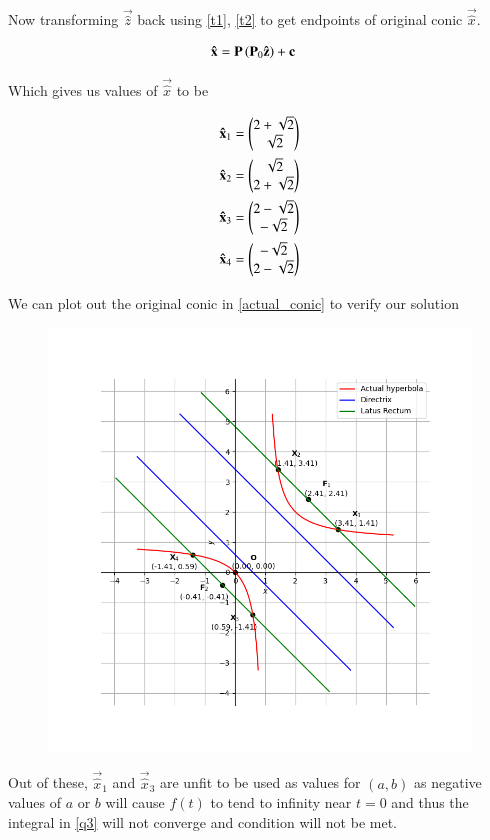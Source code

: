 \documentclass[journal]{IEEEtran}
\begin{document}
Now transforming $\vec{\hat{z}}$ back using \eqref{t1}, \eqref{t2} to get endpoints of original conic $\vec{\hat{x}}$.

\begin{align}
	\mathbf{\hat{x}} &= \mathbf{P}\left(\mathbf{P}_0 \mathbf{\hat{z}}\right) + \mathbf{c}
\end{align}

Which gives us values of $\vec{\hat{x}}$ to be

\begin{align*}
	\mathbf{\hat{x}}_1 &= \begin{pmatrix}2+\sqrt{2} \\ \sqrt{2}\end{pmatrix}\\
	\mathbf{\hat{x}}_2 &= \begin{pmatrix}\sqrt{2} \\ 2+\sqrt{2}\end{pmatrix}\\
	\mathbf{\hat{x}}_3 &= \begin{pmatrix}2-\sqrt{2} \\ -\sqrt{2}\end{pmatrix}\\
	\mathbf{\hat{x}}_4 &= \begin{pmatrix}-\sqrt{2} \\ 2-\sqrt{2}\end{pmatrix}
\end{align*}

We can plot out the original conic in \eqref{actual_conic} to verify our solution

\begin{figure}[H]
	\centering
	\includegraphics[width=0.75\columnwidth]{Figures/Hyperbola.png} 
	\caption{}
	\label{fig:Hyperbola}
\end{figure}

Out of these, $\vec{\hat{x}}_1$ and $\vec{\hat{x}}_3$ are unfit to be used as values for $(a, b)$ as negative values of $a$ or $b$ will cause $f(t)$ to tend to infinity near $t = 0$ and thus the integral in \eqref{q3} will not converge and condition will not be met.\\
\end{document}
